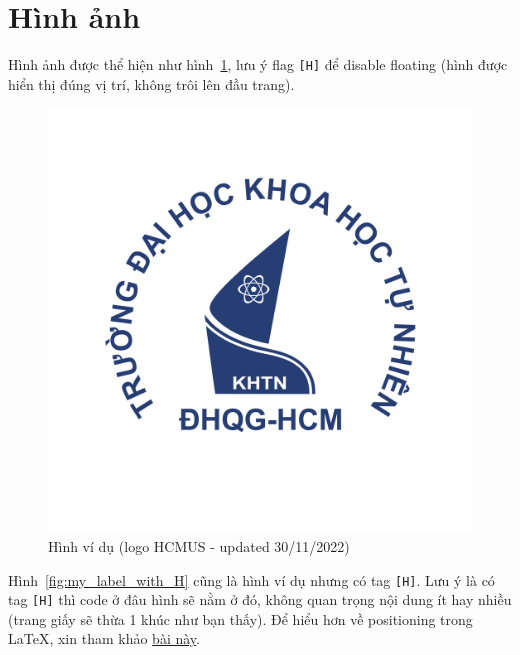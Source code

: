 \section{Hình ảnh}
Hình ảnh được thể hiện như hình~\ref{fig:my_label}, lưu ý flag \texttt{[H]} để disable floating (hình được hiển thị đúng vị trí, không trôi lên đầu trang).
\begin{figure}%
    \centering
    \includegraphics[scale=.4]{img/hcmus-logo.png}
    \caption{Hình ví dụ (logo HCMUS - updated 30/11/2022)}
    \label{fig:my_label}
\end{figure}

Hình~\ref{fig:my_label_with_H} cũng là hình ví dụ nhưng có tag \texttt{[H]}. Lưu ý là có tag \texttt{[H]} thì code ở đâu hình sẽ nằm ở đó, không quan trọng nội dung ít hay nhiều (trang giấy sẽ thừa 1 khúc như bạn thấy). Để hiểu hơn về positioning trong LaTeX, xin tham khảo \href{https://www.overleaf.com/learn/latex/Positioning_images_and_tables}{bài này}.

